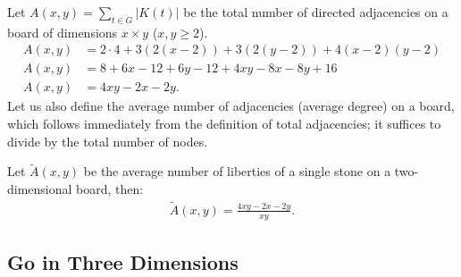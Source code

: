 Let \(A(x,y) = \sum_{t \in G} |K(t)|\) be the total number of directed adjacencies on a board of dimensions \(x\times y\) ($x, y \ge 2$).
\begin{align*}
	A(x,y)&= 2\cdot4 + 3(2(x-2))+3(2(y-2))+4(x-2)(y-2)\\
	A(x,y)&= 8 + 6x-12+6y-12+4xy-8x-8y+16\\
	A(x,y)&= 4xy-2x-2y.
\end{align*}
Let us also define the average number of adjacencies (average degree) on a board, which follows immediately from the definition of total adjacencies; it suffices to divide by the total number of nodes.

Let \(\tilde{A}(x,y)\) be the average number of liberties of a single stone on a two-dimensional board, then:
\begin{align*}
	\tilde{A}(x,y)= \frac{4xy-2x-2y}{xy}.
\end{align*}
\subsection{Go in Three Dimensions}

